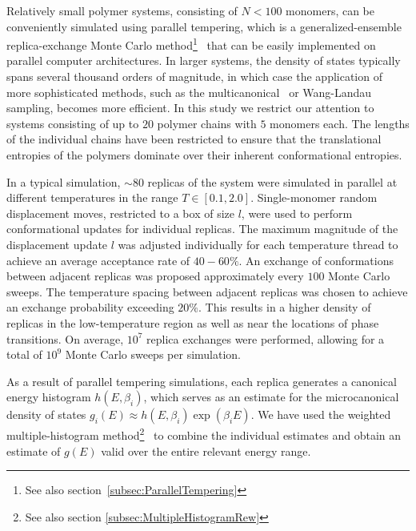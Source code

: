 \documentclass[12pt]{report}
\begin{document}
%
Relatively small polymer systems, consisting of $N < 100$ monomers, can be conveniently simulated using parallel tempering, which is a generalized-ensemble replica-exchange Monte Carlo method\footnote{See also section~\ref{subsec:ParallelTempering}}~\cite{sw1,geyer1,huku1,huku2} that can be easily implemented on parallel computer architectures. In larger systems, the density of states typically spans several thousand orders of magnitude, in which case the application of more sophisticated methods, such as the multicanonical~\cite{muca1a,muca1b,muca2,muca3,muca4,Bachmann2013} or Wang-Landau~\cite{wl1,wl2,wl3} sampling, becomes more efficient. In this study we restrict our attention to systems consisting of up to $20$ polymer chains with $5$ monomers each. The lengths of the individual chains have been restricted to ensure that the translational entropies of the polymers dominate over their inherent conformational entropies.
%

%
In a typical simulation, $\sim 80$ replicas of the system were simulated in parallel at different temperatures in the range $T \in \left[0.1,2.0\right]$. Single-monomer random displacement moves, restricted to a box of size $l$, were used to perform conformational updates for individual replicas. The maximum magnitude of the displacement update $l$ was adjusted individually for each temperature thread to achieve an average acceptance rate of $40-60\%$. An exchange of conformations between adjacent replicas was proposed approximately every $100$ Monte Carlo sweeps. The temperature spacing between adjacent replicas was chosen to achieve an exchange probability exceeding $20\%$. This results in a higher density of replicas in the low-temperature region as well as near the locations of phase transitions. On average, $10^7$ replica exchanges were performed, allowing for a total of 
$10^9$ Monte Carlo sweeps per simulation. 
%

%
As a result of parallel tempering simulations, each replica generates a canonical energy histogram $h(E,\beta_{i})$, which serves as an estimate for the microcanonical density of states $g_{i}(E) \approx h(E,\beta_{i})\exp{(\beta _{i} E)}$. We have used the weighted multiple-histogram method\footnote{See also section \ref{subsec:MultipleHistogramRew}}~\cite{Ferrenberg1989,Kumar1992} to combine the individual estimates and obtain an estimate of $g(E)$ valid over the entire relevant energy range.
%

\end{document}
